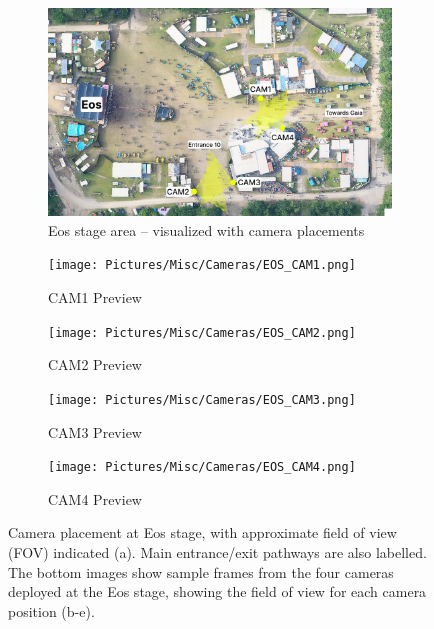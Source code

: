 \begin{figure}[htbp!]
  \centering
  \begin{subfigure}{0.9\textwidth}
    \centering
    \includegraphics[width=\textwidth]{Pictures/Figures/eos_cameras.png}
    \caption{Eos stage area -- visualized with camera placements}
  \end{subfigure}
  \begin{subfigure}{0.42\textwidth}
    \centering
    \texttt{[image: Pictures/Misc/Cameras/EOS\_CAM1.png]}
    \caption{CAM1 Preview}
  \end{subfigure}%
  \hspace{0.06\textwidth}
  \begin{subfigure}{0.42\textwidth}
    \centering
    \texttt{[image: Pictures/Misc/Cameras/EOS\_CAM2.png]}
    \caption{CAM2 Preview}
  \end{subfigure}

  \begin{subfigure}{0.42\textwidth}
    \centering
    \texttt{[image: Pictures/Misc/Cameras/EOS\_CAM3.png]}
    \caption{CAM3 Preview}
  \end{subfigure}%
  \hspace{0.06\textwidth}
  \begin{subfigure}{0.42\textwidth}
    \centering
    \texttt{[image: Pictures/Misc/Cameras/EOS\_CAM4.png]}
    \caption{CAM4 Preview}
  \end{subfigure}

  \caption{Camera placement at Eos stage, with approximate field of view (FOV) indicated (a). Main entrance/exit pathways are also labelled. The bottom images show sample frames from the four cameras deployed at the Eos stage, showing the field of view for each camera position (b-e).}
  \label{fig:eos_cameras}
  \clearpage

\end{figure}


